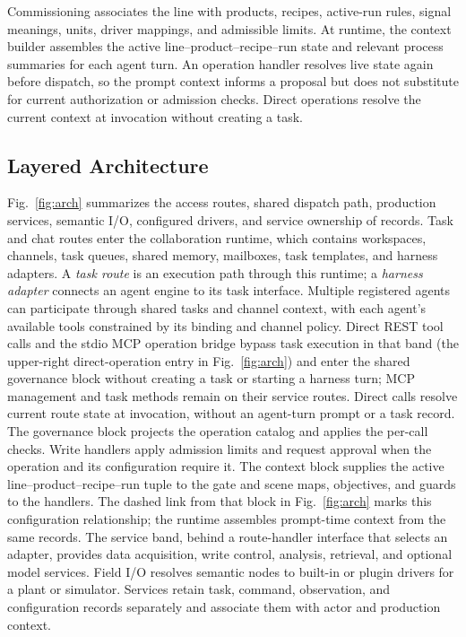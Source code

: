 Commissioning associates the line with products, recipes, active-run rules,
signal meanings, units, driver mappings, and admissible limits. At runtime,
the context builder assembles the active line--product--recipe--run state and
relevant process summaries for each agent turn. An operation handler resolves
live state again before dispatch, so the prompt context informs a proposal but
does not substitute for current authorization or admission checks. Direct
operations resolve the current context at invocation without creating a task.

\subsection{Layered Architecture}
\label{sec:layers}
\label{sec:arch}
Fig.~\ref{fig:arch} summarizes the access routes, shared dispatch path,
production services, semantic I/O, configured drivers, and service ownership
of records. Task and chat routes enter the collaboration runtime, which
contains workspaces, channels, task queues, shared memory, mailboxes, task
templates, and harness adapters. A \emph{task route} is an execution path
through this runtime; a \emph{harness adapter} connects an agent engine to its
task interface. Multiple registered agents can participate through shared
tasks and channel context, with each agent's available tools constrained by
its binding and channel policy. Direct REST tool
calls and the stdio MCP operation bridge bypass task execution in that band
(the upper-right direct-operation entry in
Fig.~\ref{fig:arch}) and enter the shared governance block without creating a
task or starting a harness turn; MCP management and task methods remain on
their service routes. Direct calls resolve current route state at invocation,
without an agent-turn prompt or a task record.
The governance block projects the operation catalog and applies the per-call
checks. Write handlers apply admission limits and request approval when the
operation and its configuration require it. The
context block supplies the active line--product--recipe--run tuple to the gate
and scene maps, objectives, and guards to the handlers. The dashed link from
that block in Fig.~\ref{fig:arch} marks this configuration relationship; the
runtime assembles prompt-time context from the same records. The service band,
behind a route-handler interface that selects an adapter, provides data
acquisition, write control, analysis, retrieval, and optional model services.
Field I/O resolves semantic nodes to built-in or plugin drivers for a plant or
simulator. Services retain task, command, observation, and configuration
records separately and associate them with actor and production context.

